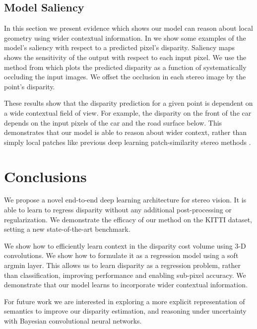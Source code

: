 \documentclass[10pt,twocolumn,letterpaper]{article}
\begin{document}
\subsection{Model Saliency}
\label{sec:saliency}

In this section we present evidence which shows our model can reason about local geometry using wider contextual information. In  we show some examples of the model's saliency with respect to a predicted pixel's disparity. Saliency maps \cite{simonyan2013deep} shows the sensitivity of the output with respect to each input pixel. We use the method from \cite{zeiler2014visualizing} which plots the predicted disparity as a function of systematically occluding the input images. We offset the occlusion in each stereo image by the point's disparity.

These results show that the disparity prediction for a given point is dependent on a wide contextual field of view. For example, the disparity on the front of the car depends on the input pixels of the car and the road surface below. This demonstrates that our model is able to reason about wider context, rather than simply  local patches like previous deep learning patch-similarity stereo methods \cite{zbontar2016stereo,luo2016efficient}.

\section{Conclusions}

We propose a novel end-to-end deep learning architecture for stereo vision. It is able to learn to regress disparity without any additional post-processing or regularization. We demonstrate the efficacy of our method on the KITTI dataset, setting a new state-of-the-art benchmark.

We show how to efficiently learn context in the disparity cost volume using 3-D convolutions. We show how to formulate it as a regression model using a soft argmin layer. This allows us to learn disparity as a regression problem, rather than classification, improving performance and enabling sub-pixel accuracy. We demonstrate that our model learns to incorporate wider contextual information.

For future work we are interested in exploring a more explicit representation of semantics to improve our disparity estimation, and reasoning under uncertainty with Bayesian convolutional neural networks.


{\footnotesize


}
\end{document}
